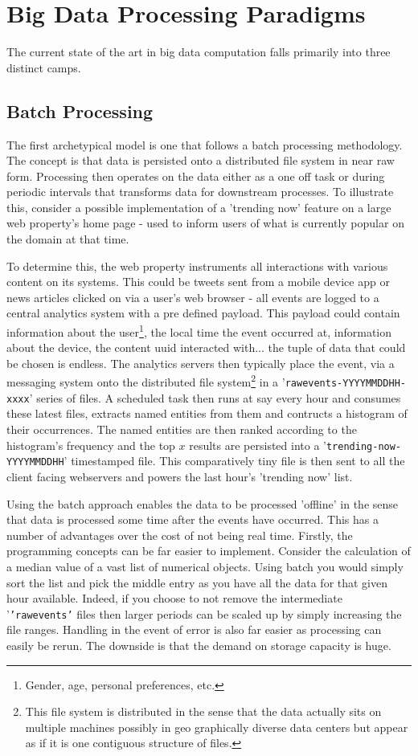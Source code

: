 \documentclass[a4paper,11pt]{scrreprt}
\begin{document}
\section{Big Data Processing Paradigms}
The current state of the art in big data computation falls primarily into three distinct camps.
\subsection{Batch Processing}
The first archetypical model is one that follows a batch processing methodology. The concept is that data is persisted onto a distributed file system in near raw form. Processing then operates on the data either as a one off task or during periodic intervals that transforms data for downstream processes. To illustrate this, consider a possible implementation of a 'trending now' feature on a large web property's home page - used to inform users of what is currently popular on the domain at that time. 

To determine this, the web property instruments all interactions with various content on its systems. This could be tweets sent from a mobile device app or news articles clicked on via a user's web browser - all events are logged to a central analytics system with a pre defined payload. This payload could contain information about the user\footnote{Gender, age, personal preferences, etc.}, the local time the event occurred at, information about the device, the content \acrshort{uuid} interacted with... the tuple of data that could be chosen is endless. The analytics servers then typically place the event, via a messaging system onto the distributed file system\footnote{This file system is distributed in the sense that the data actually sits on multiple machines possibly in geo graphically diverse data centers but appear as if it is one contiguous structure of files.} in a '\texttt{rawevents-YYYYMMDDHH-xxxx}' series of files. A scheduled task then runs at say every hour and consumes these latest files, extracts named entities from them and contructs a histogram of their occurrences. The named entities are then ranked according to the histogram's frequency and the top \(x\) results are persisted into a '\texttt{trending-now-YYYYMMDDHH}' timestamped file. This comparatively tiny file is then sent to all the client facing webservers and powers the last hour's 'trending now' list.

Using the batch approach enables the data to be processed 'offline' in the sense that data is processed some time after the events have occurred.  This has a number of advantages over the cost of not being real time. Firstly, the programming concepts can be far easier to implement. Consider the calculation of a median value of a vast list of numerical objects. Using batch you would simply sort the list and pick the middle entry as you have all the data for that given hour available. Indeed, if you choose to not remove the intermediate '\texttt{'rawevents'} files then larger periods can be scaled up by simply increasing the file ranges. Handling in the event of error is also far easier as processing can easily be rerun. The downside is that the demand on storage capacity is huge.\\
\end{document}
